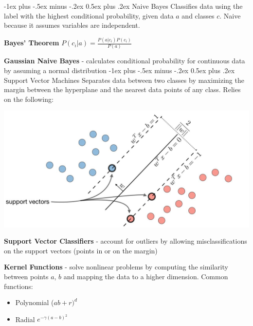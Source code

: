 \documentclass[10pt,landscape]{article}
\makeatletter
\renewcommand{\section}{\@startsection{section}{1}{0mm}%
                                {-1ex plus -.5ex minus -.2ex}%
                                {0.5ex plus .2ex}%
                                {\normalfont\large\bfseries}}
\makeatother
\begin{document}
\begin{multicols}{3}
\section{Naive Bayes}
Classifies data using the label with the highest conditional probability, given data $a$ and classes $c$. Naive because it assumes variables are independent.

\textbf{Bayes' Theorem} $ P({c_i}|{a})  = \frac{P({a}|{c_i})P({c_i})}{P({a})}$

\textbf{Gaussian Naive Bayes} - calculates conditional probability for continuous data by assuming a normal distribution
\section{Support Vector Machines}
Separates data between two classes by maximizing the margin between the hyperplane and the nearest data points of any class. Relies on the following: 
\vspace{-2mm}
\begin{center}
    \includegraphics[scale = .24]{images/svmNew2.JPG}
\end{center}
\vspace{-2mm}
\textbf{Support Vector Classifiers} - account for outliers by allowing misclassifications on the support vectors (points in or on the margin) 

\textbf{Kernel Functions} - solve nonlinear problems by computing the similarity between points $a$, $b$ and mapping the data to a higher dimension. Common functions:
\begin{itemize}[label={--},leftmargin=4mm]
\vspace{-1mm}
\itemsep -.4mm 
\item Polynomial ($ab + r)^d$
\item Radial $e^{-\gamma(a-b)^2}$
\end{itemize}


\end{multicols}
\end{document}
